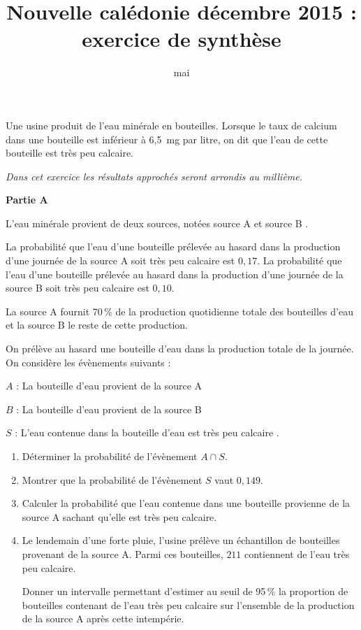 \documentclass[12pt,frenchb]{article}
\title{Nouvelle calédonie décembre 2015 : exercice de synthèse}
\date{mai \the\year}
\author{}
\begin{document}
Une usine produit de l'eau minérale en bouteilles. Lorsque le taux de calcium dans une
bouteille est inférieur à 6,5~mg par litre, on dit que l'eau de cette bouteille est très peu
calcaire.

\smallskip

\emph{Dans cet exercice les résultats approchés seront arrondis au millième.}

\smallskip

\textbf{Partie A}

\medskip

L'eau minérale provient de deux sources, notées \og source A \fg{} et \og source B \fg.

La probabilité que l'eau d'une bouteille prélevée au hasard dans la production d'une journée
de la source A soit très peu calcaire est $0,17$. La probabilité que l'eau d'une bouteille prélevée au hasard dans la production d'une journée de la source B soit très peu calcaire est $0,10$.

\smallskip

La source A fournit 70\,\% de la production quotidienne totale des bouteilles d'eau et la source
B le reste de cette production.

\smallskip

On prélève au hasard une bouteille d'eau dans la production totale de la journée. On considère
les évènements suivants :

$A$ : \og La bouteille d'eau provient de la source A \fg

$B$ : \og La bouteille d'eau provient de la source B \fg

$S$ : \og L'eau contenue dans la bouteille d'eau est très peu calcaire \fg.

\medskip

\begin{enumerate}
\item Déterminer la probabilité de l'évènement $A \cap S$.
\item Montrer que la probabilité de l'évènement $S$ vaut $0,149$.
\item Calculer la probabilité que l'eau contenue dans une bouteille provienne de la
source A sachant qu'elle est très peu calcaire.
\item Le lendemain d'une forte pluie, l'usine prélève un échantillon de  bouteilles provenant de la source A. Parmi ces bouteilles, $211$ contiennent de l'eau très peu calcaire. 

Donner un intervalle permettant d'estimer au seuil de 95\,\% la proportion
de bouteilles contenant de l'eau très peu calcaire sur l'ensemble de la production
de la source A après cette intempérie.
\end{enumerate}
\end{document}
